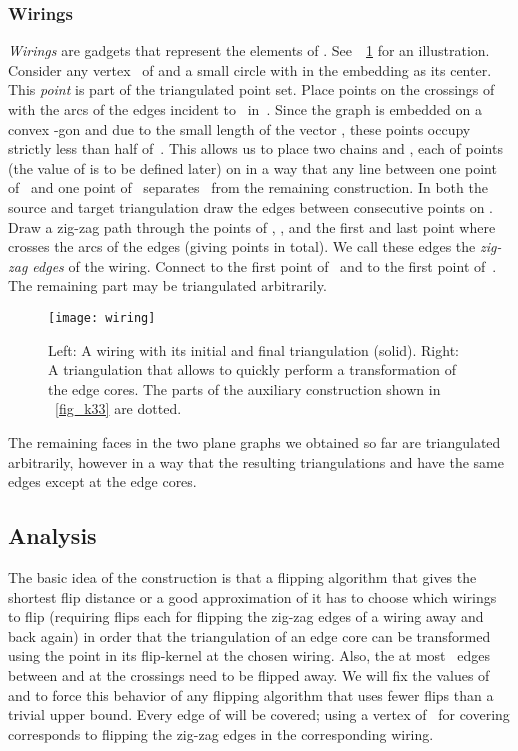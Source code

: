 \documentclass[11pt,a4paper]{article}
\begin{document}
\subsubsection{Wirings}
\emph{Wirings} are gadgets that represent the elements of .
See~\figurename~\ref{fig_wiring} for an illustration.
Consider any vertex~ of  and a small circle  with  in the embedding as its center.
This \emph{point}  is part of the triangulated point set.
Place points on the crossings of  with the arcs of the edges incident to~ in~.
Since the graph is embedded on a convex -gon and due to the small length of the vector , these points occupy strictly less than half of~.
This allows us to place two chains  and , each of  points (the value of  is to be defined later) on  in a way that any line between one point of~ and one point of~ separates~ from the remaining construction.
In both the source and target triangulation draw the edges between consecutive points on .
Draw a zig-zag path through the points of , , and the first and last point where  crosses the arcs of the edges (giving  points in total).
We call these edges the \emph{zig-zag edges} of the wiring.
Connect  to the first point of~ and to the first point of~.
The remaining part may be triangulated arbitrarily.

\begin{figure}
\centering
\texttt{[image: wiring]}
\caption{Left: A wiring with its initial and final triangulation (solid).
Right: A triangulation that allows to quickly perform a transformation of the edge cores.
The parts of the auxiliary construction shown in \figurename~\ref{fig_k33} are dotted.
}
\label{fig_wiring}
\end{figure}


The remaining faces in the two plane graphs we obtained so far are triangulated arbitrarily, however in a way that the resulting triangulations  and  have the same edges except at the edge cores.


\subsection{Analysis}
\newcommand{\opt}{\ensuremath{\mathrm{opt}}}
The basic idea of the construction is that a flipping algorithm that gives the shortest flip distance or a good approximation of it has to choose which wirings to flip (requiring  flips each for flipping the zig-zag edges of a wiring away and back again) in order that the triangulation of an edge core can be transformed using the point in its flip-kernel at the chosen wiring.
Also, the at most~ edges between and at the crossings need to be flipped away.
We will fix the values of  and  to force this behavior of any flipping algorithm that uses fewer flips than a trivial upper bound.
Every edge of  will be covered; using a vertex of~ for covering corresponds to flipping the zig-zag edges in the corresponding wiring.
\end{document}
